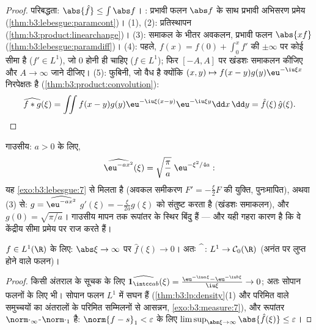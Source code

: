 \begin{proof}
परिबद्धता: $\abs{\hat f} \leq \int\abs f$। : प्रभावी फलन $\abs f$ के साथ प्रभावी अभिसरण
प्रमेय (\cref{thm:b3:lebesgue:paramcont})। (1), (2): प्रतिस्थापन (\cref{thm:b3:product:linearchange})। (3): समाकल के भीतर
अवकलन, प्रभावी फलन $\abs{xf}$ (\cref{thm:b3:lebesgue:paramdiff})। (4): पहले, $f(x) = f(0)
+ \int_0^xf'$ की $\pm\infty$ पर कोई
सीमा है ($f' \in L^1$), जो $0$ होनी ही चाहिए ($f \in L^1$); फिर $[-A,
A]$ पर खंडशः
समाकलन कीजिए और $A \to \infty$ जाने दीजिए। (5): फुबिनी, जो वैध है क्योंकि
$(x,y)\mapsto f(x - y)g(y)\eu^{-\iu\xi x}$ निरपेक्षतः  है (\cref{thm:b3:product:convolution}):
\[
\widehat{f*g}(\xi) = \iint f(x - y)g(y)\eu^{-\iu\xi(x - y)}
\eu^{-\iu\xi y}\dd x\,\dd y = \hat f(\xi)\,\hat g(\xi).
\]
\end{proof}

\begin{example}\label{ex:b3:fouriertransform:gaussian}
गाउसीय: $a > 0$ के लिए,
\[
\widehat{\eu^{-ax^2}}(\xi) =
\sqrt{\frac\pi a}\;\eu^{-\xi^2/4a} :
\]
यह \cref{exo:b3:lebesgue:7} से मिलता है (अवकल समीकरण $F' = -\frac\xi{2}F$ की युक्ति, पुनःमापित), अथवा
(3) से: $g = \widehat{\eu^{-ax^2}}$ $g'(\xi) = -\frac{\xi}{2a}g(\xi)$ को संतुष्ट करता है (खंडशः समाकलन), और $g(0) = \sqrt{\pi/a}$।
गाउसीय मापन तक रूपांतर के स्थिर बिंदु हैं --- और यही गहरा कारण है
कि वे केंद्रीय सीमा प्रमेय पर राज करते हैं।
\end{example}

\begin{theorem}[रीमान--लेबेग]
\label{thm:b3:fouriertransform:riemannlebesgue}
$f \in L^1(\R)$ के लिए: $\abs\xi \to
\infty$ पर $\hat f(\xi) \to 0$। अतः $\widehat{\phantom f} \colon L^1 \to \mathcal
C_0(\R)$ (अनंत पर लुप्त होने वाले 
फलन)।
\end{theorem}

\begin{proof}
किसी अंतराल के सूचक के लिए $\widehat{\mathbf 1_{\intcc
ab}}(\xi) = \frac{\eu^{-\iu a\xi} - \eu^{-\iu b\xi}}{\iu\xi}
\to 0$; अतः सोपान फलनों के लिए भी। सोपान
फलन $L^1$ में सघन हैं (\cref{thm:b3:lp:density}(1) और परिमित  वाले समुच्चयों का
अंतरालों के परिमित सम्मिलनों से आसन्नन, \cref{exo:b3:measure:7}), और रूपांतर
$\norm\cdot_\infty$-$\norm\cdot_1$  है: $\norm{f -
s}_1 < \varepsilon$ के लिए $\limsup_{\abs\xi\to\infty}\abs{\hat
f(\xi)} \leq \varepsilon$।
\end{proof}

